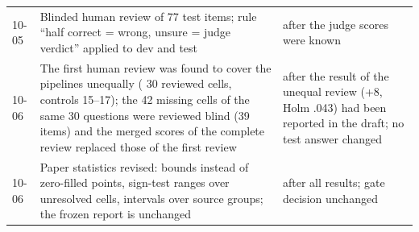 \begin{table}[tp]
\begin{tabularx}{\textwidth}{@{}p{1.6cm}Xp{5.4cm}@{}}
10-05 & Blinded human review of 77 test items; rule ``half correct = wrong, unsure = judge verdict'' applied to dev and test & after the judge scores were known \\
10-06 & The first human review was found to cover the pipelines unequally (\lexb{} 30 reviewed cells, controls 15--17); the 42 missing cells of the same 30 questions were reviewed blind (39 items) and the merged scores of the complete review replaced those of the first review & after the result of the unequal review (+8, Holm .043) had been reported in the draft; no test answer changed \\
10-06 & Paper statistics revised: bounds instead of zero-filled points, sign-test ranges over unresolved cells, intervals over source groups; the frozen report is unchanged & after all results; gate decision unchanged \\
\bottomrule
\end{tabularx}

\end{table}
